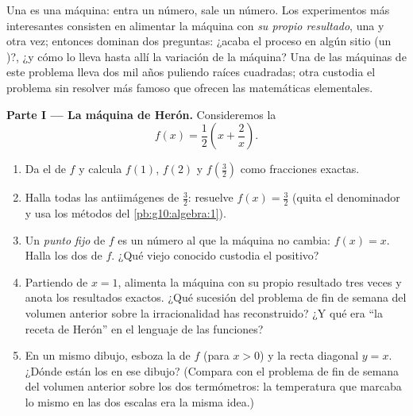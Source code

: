 \begin{problem}
\label{pb:g10:functions:1}
Una  es una máquina: entra un número, sale un número. Los
experimentos más interesantes consisten en alimentar la máquina con
\emph{su propio resultado}, una y otra vez; entonces dominan dos
preguntas: ¿acaba el proceso en algún sitio (un \emph{})?, ¿y
cómo lo lleva hasta allí la variación de la máquina? Una de las máquinas
de este problema lleva dos mil años puliendo raíces cuadradas; otra
custodia el problema sin resolver más famoso que ofrecen las matemáticas
elementales.

\medskip
\noindent\textbf{Parte I --- La máquina de Herón.}
Consideremos la 
\[
f(x) = \frac12\left(x + \frac2x\right).
\]
\begin{enumerate}
  \item Da el  de $f$ y calcula $f(1)$, $f(2)$ y
        $f\!\left(\frac32\right)$ como fracciones exactas.
  \item Halla todas las antiimágenes de $\frac32$: resuelve
        $f(x) = \frac32$ (quita el denominador y usa los métodos del
        \cref{pb:g10:algebra:1}).
  \item Un \emph{punto fijo} de $f$ es un número al que
        la máquina no cambia: $f(x) = x$. Halla los dos  de
        $f$. ¿Qué viejo conocido custodia el positivo?
  \item Partiendo de $x = 1$, alimenta la máquina con su propio resultado
        tres veces y anota los resultados exactos. ¿Qué sucesión del
        problema de fin de semana del volumen anterior sobre la
        irracionalidad has reconstruido? ¿Y qué era ``la receta de Herón''
        en el lenguaje de las funciones?
  \item En un mismo dibujo, esboza la  de $f$ (para $x > 0$) y la
        recta diagonal $y = x$. ¿Dónde están los  en ese
        dibujo? (Compara con el problema de fin de semana del volumen
        anterior sobre los dos termómetros: la temperatura que marcaba lo
        mismo en las dos escalas era la misma idea.)
\end{enumerate}


\end{problem}
